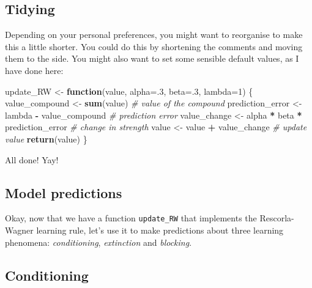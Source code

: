 \documentclass[]{book}
\newenvironment{Shaded}{\begin{snugshade}}{\end{snugshade}}
\newcommand{\CommentTok}[1]{\textcolor[rgb]{0.56,0.35,0.01}{\textit{#1}}}
\newcommand{\ControlFlowTok}[1]{\textcolor[rgb]{0.13,0.29,0.53}{\textbf{#1}}}
\newcommand{\DataTypeTok}[1]{\textcolor[rgb]{0.13,0.29,0.53}{#1}}
\newcommand{\DecValTok}[1]{\textcolor[rgb]{0.00,0.00,0.81}{#1}}
\newcommand{\KeywordTok}[1]{\textcolor[rgb]{0.13,0.29,0.53}{\textbf{#1}}}
\newcommand{\NormalTok}[1]{#1}
\newcommand{\OperatorTok}[1]{\textcolor[rgb]{0.81,0.36,0.00}{\textbf{#1}}}
\newcommand{\StringTok}[1]{\textcolor[rgb]{0.31,0.60,0.02}{#1}}
\begin{document}
\hypertarget{tidying}{%
\subsection{Tidying}\label{tidying}}

Depending on your personal preferences, you might want to reorganise to make this a little shorter. You could do this by shortening the comments and moving them to the side. You might also want to set some sensible default values, as I have done here:

\begin{Shaded}
\begin{Highlighting}[]
\NormalTok{update_RW <-}\StringTok{ }\ControlFlowTok{function}\NormalTok{(value, }\DataTypeTok{alpha=}\NormalTok{.}\DecValTok{3}\NormalTok{, }\DataTypeTok{beta=}\NormalTok{.}\DecValTok{3}\NormalTok{, }\DataTypeTok{lambda=}\DecValTok{1}\NormalTok{) \{}
\NormalTok{  value_compound <-}\StringTok{ }\KeywordTok{sum}\NormalTok{(value)                    }\CommentTok{# value of the compound }
\NormalTok{  prediction_error <-}\StringTok{ }\NormalTok{lambda }\OperatorTok{-}\StringTok{ }\NormalTok{value_compound     }\CommentTok{# prediction error}
\NormalTok{  value_change <-}\StringTok{ }\NormalTok{alpha }\OperatorTok{*}\StringTok{ }\NormalTok{beta }\OperatorTok{*}\StringTok{ }\NormalTok{prediction_error }\CommentTok{# change in strength}
\NormalTok{  value <-}\StringTok{ }\NormalTok{value }\OperatorTok{+}\StringTok{ }\NormalTok{value_change                   }\CommentTok{# update value}
  \KeywordTok{return}\NormalTok{(value)}
\NormalTok{\}}
\end{Highlighting}
\end{Shaded}

All done! Yay! 🎈

\hypertarget{model-predictions}{%
\subsection{Model predictions}\label{model-predictions}}

Okay, now that we have a function \texttt{update\_RW} that implements the Rescorla-Wagner learning rule, let's use it to make predictions about three learning phenomena: \emph{conditioning}, \emph{extinction} and \emph{blocking}.

\hypertarget{conditioning}{%
\subsection{Conditioning}\label{conditioning}}
\end{document}
